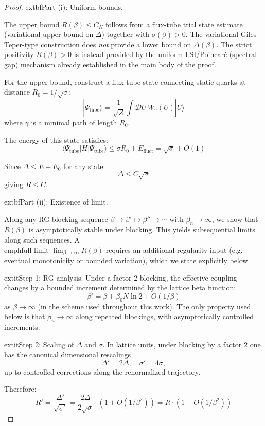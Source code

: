 \begin{proof}

		extbf{Part (i): Uniform bounds.}

The upper bound $R(\beta)\le C_N$ follows from a flux-tube trial state estimate (variational upper bound on $\Delta$) together with $\sigma(\beta)>0$.
The variational Giles--Teper-type construction does \emph{not} provide a lower bound on $\Delta(\beta)$.
The strict positivity $R(\beta)>0$ is instead provided by the uniform LSI/Poincar\'e (spectral gap) mechanism already established in the main body of the proof.

For the upper bound, construct a flux tube state connecting static quarks at 
distance $R_0 = 1/\sqrt{\sigma}$:
\[
|\Psi_{\mathrm{tube}}\rangle = \frac{1}{\sqrt{Z}} \int \mathcal{D}U \, W_\gamma(U) |U\rangle
\]
where $\gamma$ is a minimal path of length $R_0$.

The energy of this state satisfies:
\[
\langle \Psi_{\mathrm{tube}} | H | \Psi_{\mathrm{tube}} \rangle \leq \sigma R_0 + E_{\mathrm{fluct}} = \sqrt{\sigma} + O(1)
\]

Since $\Delta \leq E - E_0$ for any state:
\[
\Delta \leq C \sqrt{\sigma}
\]
giving $R \leq C$.

			extbf{Part (ii): Existence of limit.}

Along any RG blocking sequence $\beta\mapsto\beta'\mapsto\beta''\mapsto\cdots$ with $\beta_n\to\infty$, we show that $R(\beta)$ is asymptotically stable under blocking. This yields subsequential limits along such sequences. A \\emph{full} limit $\lim_{\beta\to\infty}R(\beta)$ requires an additional regularity input (e.g. eventual monotonicity or bounded variation), which we state explicitly below.

		extit{Step 1: RG analysis.}
Under a factor-2 blocking, the effective coupling changes by a bounded increment determined by the lattice beta function:
\[
\beta' = \beta + \beta_0 N\ln 2 + O(1/\beta)
\]
as $\beta\to\infty$ (in the scheme used throughout this work). The only property used below is that $\beta_n\to\infty$ along repeated blockings, with asymptotically controlled increments.

	extit{Step 2: Scaling of $\Delta$ and $\sigma$.}
In lattice units, under blocking by a factor $2$ one has the canonical dimensional rescalings
\[
\Delta' = 2\Delta, \quad \sigma' = 4\sigma,
\]
up to controlled corrections along the renormalized trajectory.

Therefore:
\[
R' = \frac{\Delta'}{\sqrt{\sigma'}} = \frac{2\Delta}{2\sqrt{\sigma}} \cdot (1 + O(1/\beta^2)) = R \cdot (1 + O(1/\beta^2))
\]


\end{proof}
